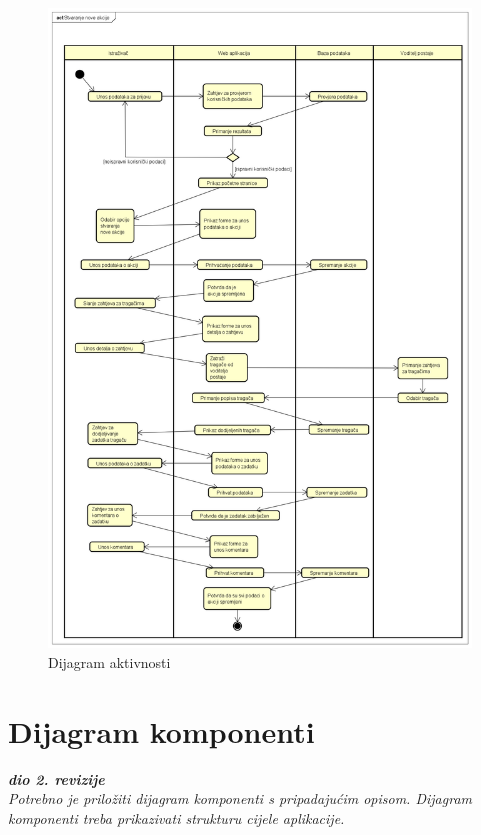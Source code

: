 			\begin{figure}[H]
				\includegraphics[scale=0.4]{dijagrami/DijagramAkt.png} 
				\centering
				\caption{Dijagram aktivnosti}
				\label{fig:promjene}
			\end{figure}
			
			\eject
		\section{Dijagram komponenti}
		
			\textbf{\textit{dio 2. revizije}}\\
		
			 \textit{Potrebno je priložiti dijagram komponenti s pripadajućim opisom. Dijagram komponenti treba prikazivati strukturu cijele aplikacije.}